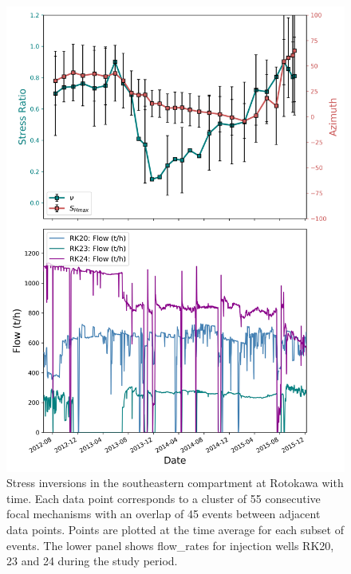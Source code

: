 \begin{figure}[h!]
\begin{center}
\includegraphics[width=0.84\columnwidth]{Chapter_5_FMs/figures/Rot_IFF_temporal/IFF_wedge_nu_Shmax_w_time_win55_ol45_RK20-23-24}
\caption[S$_{Hmax}$ and $\nu$ with time near injection wells at Rotokawa]{{
Stress inversions in the southeastern compartment at Rotokawa with time. Each data point corresponds to a cluster of 55 consecutive focal mechanisms with an overlap of 45 events between adjacent data points. Points are plotted at the time average for each subset of events. The lower panel shows \glspl{flow_rate} for injection wells RK20, 23 and 24 during the study period.
{\label{IFF_temporal}}%
}}
\end{center}
\end{figure}

